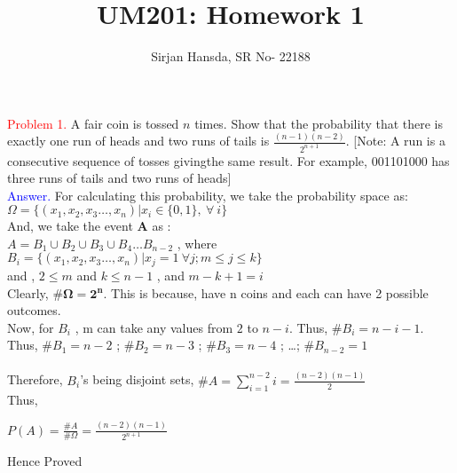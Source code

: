 \documentclass{article}
\title{UM201: Homework 1}
\author{Sirjan Hansda, SR No- 22188}
\begin{document}
\maketitle


\textcolor{red}{Problem 1.} A fair coin is tossed $n$ times. Show that the probability that there is exactly one run of heads and two runs of tails is $\frac{(n-1)(n-2)}{2^{n+1}}$.  [Note: A run is a consecutive sequence of tosses givingthe same result. For example, 001101000 has three runs of tails and two runs of heads] \\


\textcolor{blue}{Answer.} For calculating this probability, we take the probability space as: \\

$\Omega=\{(x_1,x_2,x_3 \dots , x_n) | x_i \in \{0,1\}, \: \forall \: i\}$ \\

And, we take the event \textbf A as : \\

$A= B_1 \cup B_2 \cup B_3 \cup B_4 \dots B_{n-2} $ , where $B_i=\{(x_1,x_2,x_3 \dots , x_n) | x_j=1 \: \forall j;  m \leq j\leq k\}$
\\ and ,\: $2\leq m$ and $k\leq n-1$ , and $m-k+1=i$
\\
\newline
Clearly, $\mathbf{\# \Omega=2^n} $. This is because, have n coins and each can have 2 possible outcomes.
\\
Now, for $B_i$ , m can take any values from $2$ to $n-i$. Thus, $\# B_i=n-i-1 $.
\\
Thus, $\# B_1=n-2$ ; $\# B_2=n-3$ ; $\# B_3=n-4$ ; \dots ; $\# B_{n-2} = 1$
\\
\\
Therefore, $B_i$'s being disjoint sets, $\#A=\sum_{i=1}^{n-2}i=\frac{(n-2)(n-1)}{2}$ 
\\
Thus,
\begin{center}
      $P(A)=\frac{\# A}{\# \Omega}=\frac{(n-2)(n-1)}{2^{n+1}}$
\end{center}
Hence Proved
\end{document}

